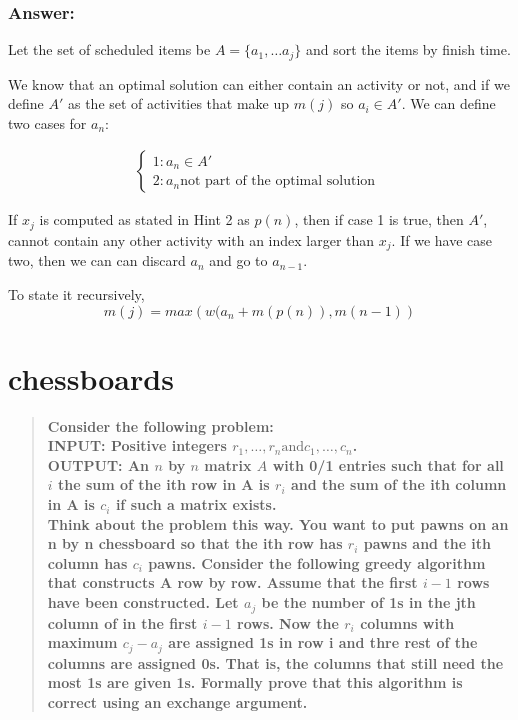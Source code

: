 \documentclass[titlepage]{article}\usepackage[]{graphicx}\usepackage[]{color}
\begin{document}
\subsubsection{Answer: }

Let the set of scheduled items be $A = \{ a_1, \dots a_j\}$ and sort the
items by finish time. 

We know that an optimal solution can either contain an activity or not, and if
we define $A'$ as the set of activities that make up $m(j)$ so 
$a_i \in A'$. We can define two cases for $a_n$:

  \begin{align*}
	  \begin{cases}
		  1: a_n \in A' \\
		  2: a_n \text{not part of the optimal solution } 
	  \end{cases}
  \end{align*}

  If $x_j$ is computed as stated in Hint 2 as $p(n)$, then if case 1 is true, then $A'$,
  cannot contain any other activity with an index larger than $x_j$. If we have
  case two, then we can can discard $a_n$ and go to $a_{n-1}$. 

  To state it recursively, 
  \[ m(j) = max \left( w(a_n + m(p(n)), m(n-1) \right) \]




\section{chessboards}

\begin{quote}
  \textbf{Consider the following problem: \\
	INPUT: Positive integers $r_1, \dots , r_n \text{and} c_1, \dots , c_n$. \\
	OUTPUT: An $n$ by $n$ matrix $A$ with 0/1 entries such that for all $i$ the
	sum of the ith row in A is $r_i$ and the sum of the ith column in A is
	$c_i$ if such a matrix exists. \\
	Think about the problem this way. You want to put pawns on an n by n
	chessboard so that the ith row has $r_i$ pawns and the ith column has $c_i$
	pawns. Consider the following greedy algorithm that constructs A row by
	row. Assume that the first $i - 1$ rows have been constructed. Let $a_j$ be
	the number of 1s in the jth column of in the first $i-1$ rows. Now the
	$r_i$ columns with maximum $c_j - a_j$ are assigned 1s in row i and thre
	rest of the columns are assigned 0s. That is, the columns that still need
	the most 1s are given 1s. Formally prove that this algorithm is correct
  using an exchange argument.}
\end{quote}
\end{document}
